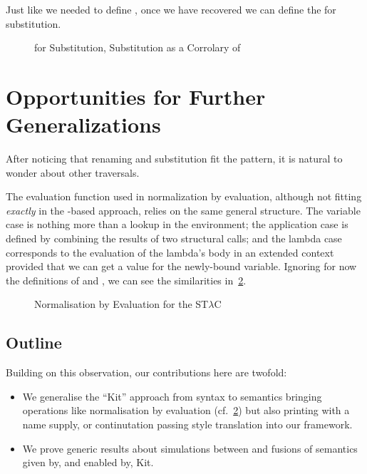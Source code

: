 Just like we needed  to define , once we have recovered 
we can define the  for substitution.

\begin{figure}[h]
\begin{minipage}{0.35\textwidth}
\end{minipage}
\begin{minipage}{0.65\textwidth}
\end{minipage}
\caption{ for Substitution, Substitution as a Corrolary of \label{fig:subkit}}
\end{figure}

\section{Opportunities for Further Generalizations}

After noticing that renaming and substitution fit the pattern, it is
natural to wonder about other traversals.

The evaluation function used in normalization by evaluation, although
not fitting \emph{exactly} in the -based approach, relies on
the same general structure. The variable case is nothing more than a
lookup in the environment; the application case is defined by combining
the results of two structural calls; and the lambda case corresponds to
the evaluation of the lambda's body in an extended context provided that
we can get a value for the newly-bound variable. Ignoring for now the
definitions of  and , we can see the similarities
in~\cref{nbe}.

\begin{figure}[h]
\caption{Normalisation by Evaluation for the ST$λ$C\label{nbe}}
\end{figure}

\subsection{Outline} Building on this observation, our contributions
here are twofold:

\begin{itemize}
  \item
    We generalise the ``Kit'' approach from syntax to semantics bringing
    operations like normalisation by evaluation (cf.~\cref{nbe}) but also
    printing with a name supply, or continutation passing style translation
    into our framework.

  \item
    We prove generic results about simulations between and fusions of
    semantics given by, and enabled by, Kit.
\end{itemize}

